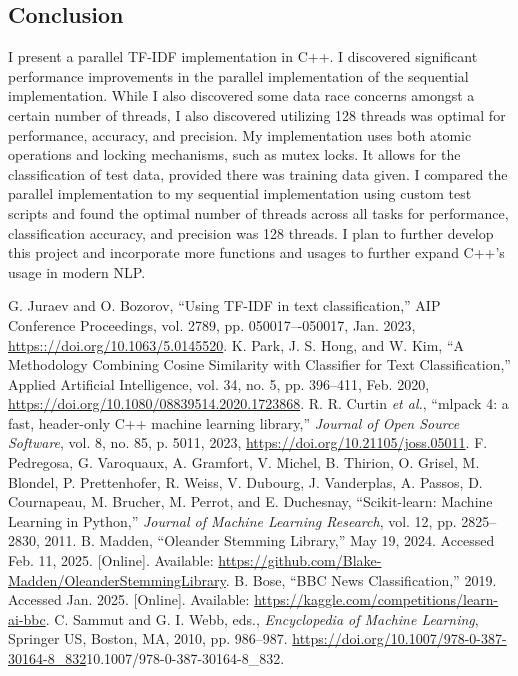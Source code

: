 \documentclass[conference]{IEEEtran}
\begin{document}
\subsection{Conclusion}
I present a parallel TF-IDF implementation in C++. I discovered significant performance improvements in the parallel implementation of the sequential implementation. While I also discovered some data race concerns amongst a certain number of threads, I also discovered utilizing 128 threads was optimal for performance, accuracy, and precision. My implementation uses both atomic operations and locking mechanisms, such as mutex locks. It allows for the classification of test data, provided there was training data given. I compared the parallel implementation to my sequential implementation using custom test scripts and found the optimal number of threads across all tasks for performance, classification accuracy, and precision was 128 threads. I plan to further develop this project and incorporate more functions and usages to further expand C++’s usage in modern NLP.

\begin{thebibliography}{00}
 G. Juraev and O. Bozorov, ``Using TF-IDF in text classification,'' AIP Conference Proceedings, vol. 2789, pp. 050017–-050017, Jan. 2023, \url{https:://doi.org/10.1063/5.0145520}.
 K. Park, J. S. Hong, and W. Kim, ``A Methodology Combining Cosine Similarity with Classifier for Text Classification,'' Applied Artificial Intelligence, vol. 34, no. 5, pp. 396--411, Feb. 2020, \url{https://doi.org/10.1080/08839514.2020.1723868}.
 R. R. Curtin \textit{et al.}, ``mlpack 4: a fast, header-only C++ machine learning library,'' \textit{Journal of Open Source Software}, vol. 8, no. 85, p. 5011, 2023, \url{https://doi.org/10.21105/joss.05011}.
 F. Pedregosa, G. Varoquaux, A. Gramfort, V. Michel, B. Thirion, O. Grisel, M. Blondel, P. Prettenhofer, R. Weiss, V. Dubourg, J. Vanderplas, A. Passos, D. Cournapeau, M. Brucher, M. Perrot, and E. Duchesnay, ``Scikit-learn: Machine Learning in Python,'' \textit{Journal of Machine Learning Research}, vol. 12, pp. 2825--2830, 2011.
 B. Madden, ``Oleander Stemming Library,'' May 19, 2024. Accessed Feb. 11, 2025. [Online]. Available: \url{https://github.com/Blake-Madden/OleanderStemmingLibrary}.
 B. Bose, ``BBC News Classification,'' 2019. Accessed Jan. 2025. [Online]. Available: \url{https://kaggle.com/competitions/learn-ai-bbc}.
 C. Sammut and G. I. Webb, eds., \textit{Encyclopedia of Machine Learning}, Springer US, Boston, MA, 2010, pp. 986--987. \url{https://doi.org/10.1007/978-0-387-30164-8_832}{10.1007/978-0-387-30164-8\_832}.
\end{thebibliography}
\end{document}

